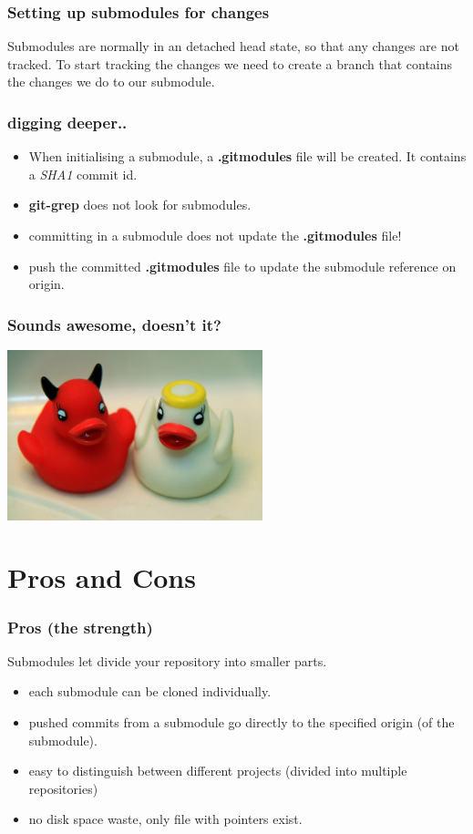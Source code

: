\documentclass[10pt]{beamer}
\begin{document}
\begin{frame}[fragile]
  \frametitle{Setting up submodules for changes}
   Submodules are normally in an detached head state, so that any changes are not tracked. To start tracking the changes we need to create a branch that contains the changes we do to our submodule.

\end{frame}

\begin{frame}
	\frametitle{digging deeper..}
	\begin{itemize}
		\item When initialising a submodule, a \textbf{.gitmodules} file will be created. It contains a \emph{SHA1} commit id.
		\item \textbf{git-grep} does not look for submodules.
		\item committing in a submodule does not update the \textbf{.gitmodules} file!
		\item push the committed \textbf{.gitmodules} file to update the submodule reference on origin.
	\end{itemize}
\end{frame}

\begin{frame}
	\frametitle{Sounds awesome, doesn't it?}
\begin{center}\includegraphics[width=280px]{images/goodbad.jpg}\end{center}
\end{frame}

\section{Pros and Cons}

\begin{frame}
  \frametitle{Pros (the strength)}
  	Submodules let divide your repository into smaller parts.
	\begin{itemize}
		\item each submodule can be cloned individually.
		\item pushed commits from a submodule go directly to the specified origin (of the submodule).
		\item easy to distinguish between different projects (divided into multiple repositories)
		\item no disk space waste, only file with pointers exist.
	\end{itemize}
\end{frame}
\end{document}
